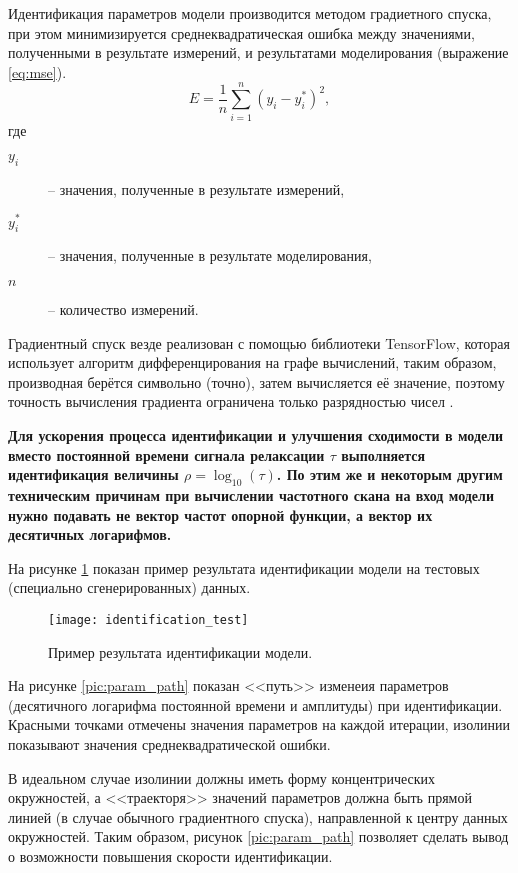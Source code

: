 	Идентификация параметров модели производится методом градиетного 
	спуска, при этом минимизируется среднеквадратическая ошибка между 
	значениями, полученными в результате измерений, и результатами 
	моделирования (выражение \ref{eq:mse}).
	\begin{equation}
		\label{eq:mse}
		E = \frac{1}{n}\sum_{i=1}^{n}\left(y_i - y_i^*\right)^2,
	\end{equation}
	где
	\begin{description}
		\item[$y_i$] -- значения, полученные в результате измерений,
		\item[$y_i^*$] -- значения, полученные в результате моделирования,
		\item[$n$] -- количество измерений.
	\end{description}

	Градиентный спуск везде реализован с помощью библиотеки TensorFlow,
	которая использует алгоритм дифференцирования на графе вычислений,
	таким образом, производная берётся символьно (точно), затем вычисляется
	её значение, поэтому точность вычисления градиента ограничена только
	разрядностью чисел \cite{hands_on_ml}.

	\textbf{Для ускорения процесса идентификации и улучшения сходимости
	в модели вместо постоянной времени сигнала релаксации $\tau$ 
	выполняется идентификация величины $\rho = \log_{10}(\tau)$. По этим же
	и некоторым	другим техническим причинам при вычислении частотного 
	скана на вход модели нужно подавать не вектор частот опорной 
	функции, а вектор их десятичных логарифмов.}

	На рисунке \ref{pic:identification_test} показан пример результата
	идентификации модели на тестовых (специально сгенерированных) данных.

	\begin{figure}[h!]
		\centering
		\texttt{[image: identification\_test]}
		\caption{Пример результата идентификации модели.}
		\label{pic:identification_test}
	\end{figure}

	На рисунке \ref{pic:param_path} показан <<путь>> изменеия параметров 
	(десятичного логарифма постоянной времени и амплитуды) при
	идентификации. Красными точками отмечены значения параметров на 
	каждой итерации, изолинии показывают значения среднеквадратической
	ошибки. 

	В идеальном случае изолинии должны иметь форму концентрических
	окружностей, а <<траекторя>> значений параметров должна быть прямой
	линией (в случае обычного градиентного спуска), направленной к центру
	данных окружностей. Таким образом, рисунок \ref{pic:param_path} 
	позволяет сделать вывод о возможности повышения скорости идентификации.

